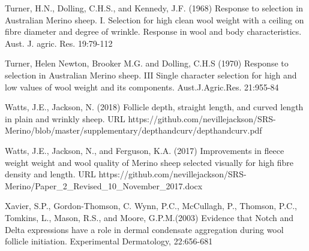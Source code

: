 \documentclass[titlepage]{article}  %
\begin{document}
\begin{thebibliography}{99}
Turner, H.N., Dolling, C.H.S., and Kennedy, J.F. (1968) Response to selection in Australian Merino sheep. I. Selection for high clean wool weight with a ceiling on fibre diameter and degree of wrinkle. Response in wool and body characteristics. Aust. J. agric. Res. 19:79-112

Turner, Helen Newton, Brooker M.G. and Dolling, C.H.S (1970) Response to selection in Australian Merino sheep. III Single character selection for high and low values of wool weight and its components. Aust.J.Agric.Res. 21:955-84

Watts, J.E., Jackson, N. (2018) Follicle depth, straight length, and curved length in plain and wrinkly sheep. URL https://github.com/nevillejackson/SRS-Merino/blob/master/supplementary/depthandcurv/depthandcurv.pdf

Watts, J.E., Jackson, N., and Ferguson, K.A. (2017) Improvements in fleece weight weight and wool quality of Merino sheep selected visually for high fibre density and length. URL https://github.com/nevillejackson/SRS-Merino/Paper\_2\_Revised\_10\_November\_2017.docx 

Xavier, S.P., Gordon-Thomson, C. Wynn, P.C., McCullagh, P., Thomson, P.C., Tomkins, L., Mason, R.S., and Moore, G.P.M.(2003) Evidence that Notch and Delta expressions have a role in dermal condensate aggregation during wool follicle initiation. Experimental Dermatology, 22:656-681

\end{thebibliography}
\end{document}
